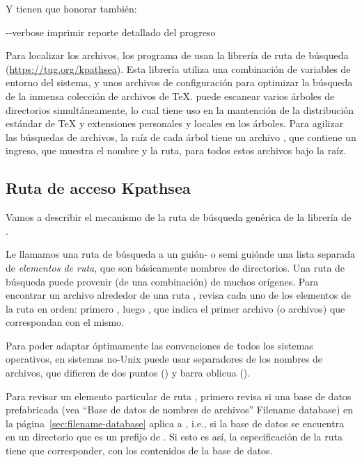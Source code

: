 \documentclass{article}
\begin{document}
Y  tienen que honorar también:
\begin{ttdescription}
\item[-{}-verbose] imprimir reporte detallado del progreso
\end{ttdescription}

Para localizar los archivos, los programa de \Webc{} usan la
librería de ruta de búsqueda \KPS{}
(\url{https://tug.org/kpathsea}). Esta librería utiliza una
combinación de variables de entorno del sistema, y unos
archivos de configuración para optimizar la búsqueda de la inmensa
colección de archivos de \TeX{}. \Webc{} puede escanear varios
árboles de directorios simultáneamente, lo cual tiene uso en
la mantención de la distribución estándar de \TeX{} y
extensiones personales y locales en los árboles. Para agilizar
las búsquedas de archivos, la raíz de cada árbol tiene un
archivo , que contiene un ingreso, que muestra el
nombre y la ruta, para todos estos archivos bajo la raíz. 

\subsection{Ruta de acceso Kpathsea}
\label{sec:kpathsea}

Vamos a describir el mecanismo de la ruta de búsqueda genérica
de la librería de \KPS{}.

Le llamamos una ruta de búsqueda a un guión- o semi guión\hyph de una
lista separada de \emph{elementos de ruta}, que son
básicamente nombres de directorios. Una ruta de búsqueda puede
provenir (de una combinación) de muchos orígenes. Para
encontrar un archivo  alrededor de una ruta
, \KPS{} revisa cada uno de los elementos de la
ruta en orden: primero , luego
, que indica el primer archivo (o
archivos) que correspondan con el mismo. 

Para poder adaptar óptimamente las convenciones de todos los
sistemas operativos, en sistemas no-Unix \KPS{} puede usar
separadores de los nombres de archivos, que difieren de dos puntos
(\samp{:}) y barra oblicua (\samp{/}). 

Para revisar un elemento particular de ruta , \KPS{}
primero revisa si una base de datos prefabricada (vea
``Base de datos de nombres de archivos'' Filename data\-base) en la
página~\ref{sec:filename-database} aplica a , i.e., si
la base de datos se encuentra en un directorio que es un
prefijo de . Si esto es así, la especificación de la
ruta tiene que corresponder, con los contenidos de la base de
datos. 
\end{document}
